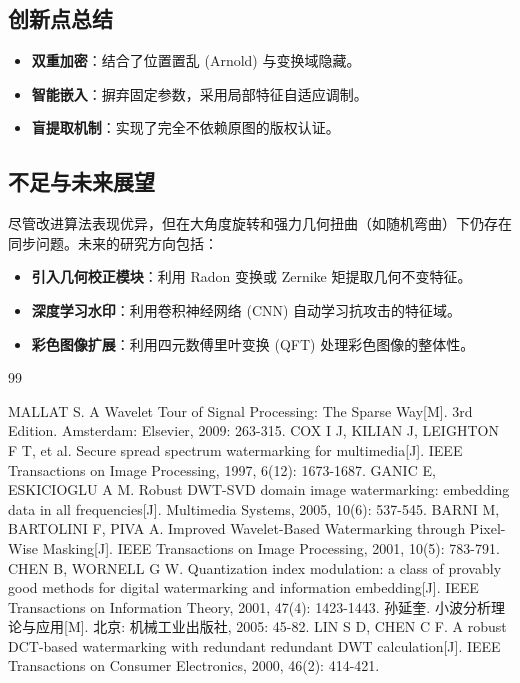 \documentclass[zihao=-4, a4paper]{ctexart} %
\begin{document}
	\subsection{创新点总结}
	\begin{itemize}
		\item \textbf{双重加密}：结合了位置置乱 (Arnold) 与变换域隐藏。
		\item \textbf{智能嵌入}：摒弃固定参数，采用局部特征自适应调制。
		\item \textbf{盲提取机制}：实现了完全不依赖原图的版权认证。
	\end{itemize}
	
	\subsection{不足与未来展望}
	尽管改进算法表现优异，但在大角度旋转和强力几何扭曲（如随机弯曲）下仍存在同步问题。未来的研究方向包括：
	\begin{itemize}
		\item \textbf{引入几何校正模块}：利用 Radon 变换或 Zernike 矩提取几何不变特征。
		\item \textbf{深度学习水印}：利用卷积神经网络 (CNN) 自动学习抗攻击的特征域。
		\item \textbf{彩色图像扩展}：利用四元数傅里叶变换 (QFT) 处理彩色图像的整体性。
	\end{itemize}
	
	\begin{thebibliography}{99}
		\addtolength{\itemsep}{-0.5em} 
		
		 MALLAT S. A Wavelet Tour of Signal Processing: The Sparse Way[M]. 3rd Edition. Amsterdam: Elsevier, 2009: 263-315.
		 COX I J, KILIAN J, LEIGHTON F T, et al. Secure spread spectrum watermarking for multimedia[J]. IEEE Transactions on Image Processing, 1997, 6(12): 1673-1687.
		 GANIC E, ESKICIOGLU A M. Robust DWT-SVD domain image watermarking: embedding data in all frequencies[J]. Multimedia Systems, 2005, 10(6): 537-545.
		 BARNI M, BARTOLINI F, PIVA A. Improved Wavelet-Based Watermarking through Pixel-Wise Masking[J]. IEEE Transactions on Image Processing, 2001, 10(5): 783-791.
		 CHEN B, WORNELL G W. Quantization index modulation: a class of provably good methods for digital watermarking and information embedding[J]. IEEE Transactions on Information Theory, 2001, 47(4): 1423-1443.
		 孙延奎. 小波分析理论与应用[M]. 北京: 机械工业出版社, 2005: 45-82.
		 LIN S D, CHEN C F. A robust DCT-based watermarking with redundant redundant DWT calculation[J]. IEEE Transactions on Consumer Electronics, 2000, 46(2): 414-421.
		
	\end{thebibliography}
	
\end{document}
